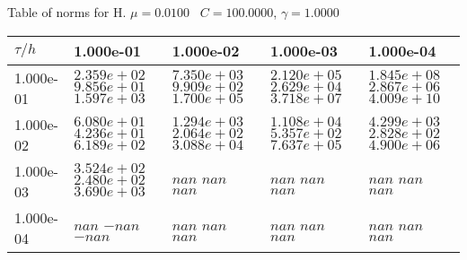 \begin{center}
Table of norms for H. $\mu = 0.0100$ \, $C = 100.0000$, $\gamma = 1.0000$
  
\begin{tabular}{|p{1in}|p{1in}|p{1in}|p{1in}|p{1in}|} \hline
$\tau / h$ &1.000e-01 &1.000e-02 &1.000e-03 &1.000e-04 \\ \hline 
1.000e-01 & $2.359e+02$  $9.856e+01$  $1.597e+03$  & $7.350e+03$  $9.909e+02$  $1.700e+05$  & $2.120e+05$  $2.629e+04$  $3.718e+07$  & $1.845e+08$  $2.867e+06$  $4.009e+10$  \\ \hline 
1.000e-02 & $6.080e+01$  $4.236e+01$  $6.189e+02$  & $1.294e+03$  $2.064e+02$  $3.088e+04$  & $1.108e+04$  $5.357e+02$  $7.637e+05$  & $4.299e+03$  $2.828e+02$  $4.900e+06$  \\ \hline 
1.000e-03 & $3.524e+02$  $2.480e+02$  $3.690e+03$  & $nan$  $nan$  $nan$  & $nan$  $nan$  $nan$  & $nan$  $nan$  $nan$  \\ \hline 
1.000e-04 & $nan$  $-nan$  $-nan$  & $nan$  $nan$  $nan$  & $nan$  $nan$  $nan$  & $nan$  $nan$  $nan$  \\ \hline 

\end{tabular}\\[20pt]
\end{center}
